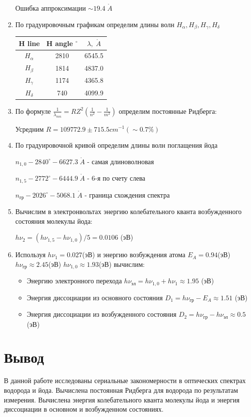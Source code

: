 \documentclass[a4paper]{article}
\begin{document}
\begin{enumerate}
    Ошибка аппроксимации $\sim 19.4 \; \mathring{A}$

    \item По градуировочным графикам определим длины волн $H_{\alpha}, H_{\beta}, H_{\gamma}, H_{\delta}$

    \begin{table}[htb]
        \centering
        \begin{tabular}{|c|c|c|}
            \hline
            H line & H angle $^{\circ}$ &  $\lambda, \; \mathring{A}$  \\
            \hline 
            $H_{\alpha}$ & 2810 & 6545.5  \\\hline
            $H_{\beta}$ & 1814 & 4837.0  \\\hline
            $H_{\gamma}$& 1174 & 4365.8\\\hline
            $H_{\delta}$ & 740 & 4099.9 \\ \hline

        \end{tabular}
    \end{table}

    
    \item По формуле $\frac{1}{\lambda_{mn}} = RZ^2(\frac{1}{n^2} - \frac{1}{m^2})$ определим постоянные Ридберга:

    Усредним $R = 109772.9 \pm 715.5 cm^{-1} (\sim 0.7\%)$

    \item По градуировочной кривой определим длины волн поглащения йода\par
    $n_{1,0} - 2840^{\circ} - 6627.3 \; \mathring{A}$ - самая длиноволновая\par
    $n_{1,5} - 2772^{\circ} - 6444.9\; \mathring{A}$ - 6-я по счету слева\par
    $n_{\text{гр}} - 2026^{\circ} - 5068.1 \; \mathring{A}$ - граница схождения спектра\par
    \item Вычислим в электронвольтах энергию колебательного кванта возбужденного состояния молекулы йода:\par
    $h\nu_2 = (h\nu_{1,5} - h\nu_{1,0})/5 = 0.0106$ (эВ)
    \item Используя $h\nu_1 = 0.027$(эВ) и энергию возбуждения атома $E_A = 0.94$(эВ) $h\nu_{\text{гр}} \approx 2.45$(эВ)  $h\nu_{1,0} \approx 1.93$(эВ) вычислим:
    \begin{itemize}
        \item Энергию электронного перехода $h\nu_{\text{эл}} = h\nu_{1,0} + h\nu_1 \approx 1.95$ (эВ)
        \item Энергия диссоциации из основного состояния $D_1 = h\nu_{\text{гр}} - E_A \approx 1.51$ (эВ)
        \item Энергия диссоциации из возбужденного состояния $D_2 = h\nu_{\text{гр}} - h\nu_{\text{эл}} \approx 0.5$ (эВ)
    \end{itemize}
     
\end{enumerate}

\section{Вывод}
В данной работе исследованы сериальные закономерности в оптических спектрах водорода и йода. 
Вычислена постоянная Ридберга для водорода по результатам измерения. Вычислена энергия колебательного 
кванта молекулы йода и энергия диссоциации в основном и возбужденном состояниях.
\end{document}
